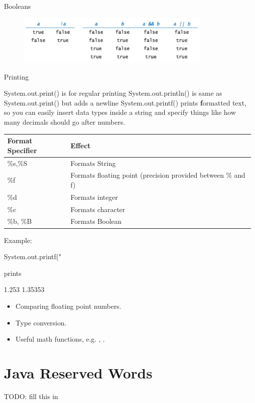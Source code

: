 Booleans

\begin{figure}[h]
	\centering
	\includegraphics[width=0.85\textwidth]{images/booleans}
	\label{fig:booleans}
\end{figure}

Printing

System.out.print() is for regular printing
System.out.println() is same as System.out.print() but adds a newline
System.out.printf() prints \textbf{f}ormatted text, so you can easily insert data types inside a string and specify things like how many decimals should go after numbers. 
\begin{tabular}{|l|l|}
\hline
Format Specifier & Effect\\
\hline
\%s,\%S & Formats String\\
\%f & Formats floating point (precision provided between \% and f)\\
\%d & Formats integer\\
\%c & Formats character\\
\%b, \%B & Formats Boolean\\
\hline
\end{tabular}

Example: 

\begin{code}
System.out.printf("%
\end{code}

prints 

\begin{code}
1.253
1.35353
\end{code}



\begin{itemize}

	\item Comparing floating point numbers.
	\item Type conversion.
	\item Useful math functions, e.g. , .

\end{itemize}

\section{Java Reserved Words}

TODO: fill this in

